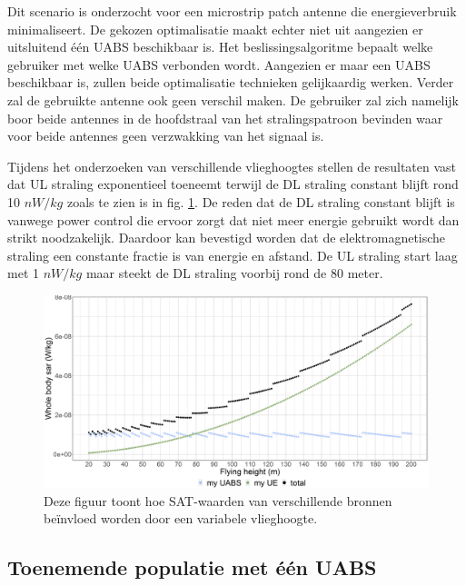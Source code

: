 \documentclass[twocolumn]{phdsymp_dutch}
\begin{document}
Dit scenario is onderzocht voor een microstrip patch antenne die energieverbruik minimaliseert.
De gekozen optimalisatie maakt echter niet uit aangezien er uitsluitend \'e\'en \gls{UABS} beschikbaar is.
Het beslissingsalgoritme bepaalt welke gebruiker met welke \gls{UABS} verbonden wordt.
Aangezien er maar een \gls{UABS} beschikbaar is, zullen beide optimalisatie technieken gelijkaardig werken.
Verder zal de gebruikte antenne ook geen verschil maken. 
De gebruiker zal zich namelijk boor beide antennes in de hoofdstraal van het stralingspatroon 
bevinden waar voor beide antennes geen verzwakking van het signaal is.

Tijdens het onderzoeken van verschillende vlieghoogtes stellen de resultaten vast  dat
\gls{UL} straling exponentieel toeneemt terwijl de \gls{DL} straling constant blijft rond 
10 $nW/kg$ zoals te zien is in fig. \ref{fig:s1_fhsar}. De reden dat de \gls{DL} straling constant blijft is vanwege power control die ervoor zorgt
dat niet meer energie gebruikt wordt dan strikt noodzakelijk. 
Daardoor kan bevestigd worden dat de elektromagnetische straling een constante fractie is van energie en afstand.
De \gls{UL} straling start laag met 1 $nW/kg$ maar steekt de \gls{DL} straling voorbij rond de 80 meter.

\begin{figure}[]
\centering
  \includegraphics[width=\linewidth]{s1/fhvssar.png}
  \caption{
    Deze figuur toont hoe SAT-waarden van verschillende bronnen be\"invloed worden door een variabele vlieghoogte.}
  \label{fig:s1_fhsar}
\end{figure}

\subsection{Toenemende populatie met \'e\'en UABS}
\end{document}
